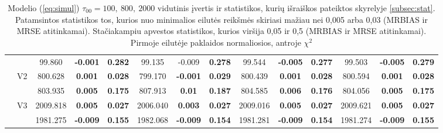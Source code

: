 \documentclass[11pt,a4paper]{article}
\begin{document}
{\begin{sidewaystable}[H]
{\begin{tabular}{cc|ccc|ccc|ccc|ccc|}
   &  & 99.860 & \textbf{-0.001} & \textbf{0.282} & 99.135 & -0.009 & \textbf{0.278} & 99.544 & \textbf{-0.005} & \textbf{0.277} & 99.503 & \textbf{-0.005} & \textbf{0.279} \\ 
   & \multirow{2}{*}{V2} & 800.628 & \textbf{0.001} & \textbf{0.028} & 799.170 & \textbf{-0.001} & \textbf{0.029} & 800.439 & \textbf{0.001} & \textbf{0.028} & 800.594 & \textbf{0.001} & \textbf{0.028} \\ 
   &  & 803.935 & \textbf{0.005} & \textbf{0.175} & 807.913 & \textbf{0.01} & \textbf{0.187} & 804.585 & \textbf{0.006} & \textbf{0.176} & 804.056 & \textbf{0.005} & \textbf{0.175} \\ 
   & \multirow{2}{*}{V3} & 2009.818 & \textbf{0.005} & \textbf{0.027} & 2006.040 & \textbf{0.003} & \textbf{0.027} & 2009.016 & \textbf{0.005} & \textbf{0.027} & 2009.621 & \textbf{0.005} & \textbf{0.027} \\ 
   &  & 1981.275 & \textbf{-0.009} & \textbf{0.155} & 1982.068 & \textbf{-0.009} & \textbf{0.154} & 1981.281 & \textbf{-0.009} & \textbf{0.154} & 1981.274 & \textbf{-0.009} & \textbf{0.155} \\ 
   \hline
\end{tabular}
}
\caption[Modelio (\ref{eq:simul}) $\tau_{00}=100,\ 800,\ 2000$ vidutinis įvertis ir statistikos]{Modelio (\ref{eq:simul}) $\tau_{00}=100,\ 800,\ 2000$ vidutinis įvertis ir statistikos, kurių išraiškos pateiktos skyrelyje \ref{subsec:stat}. Patamsintos statistikos tos, kurios nuo minimalios eilutės reikšmės skiriasi mažiau nei 0,005 arba 0,03 (MRBIAS ir MRSE atitinkamai). Stačiakampiu apvestos statistikos, kurios viršija 0,05 ir 0,5 (MRBIAS ir MRSE atitinkamai). Pirmoje eilutėje paklaidos normaliosios, antroje $\chi^2$}
\end{sidewaystable}
}
\end{document}
